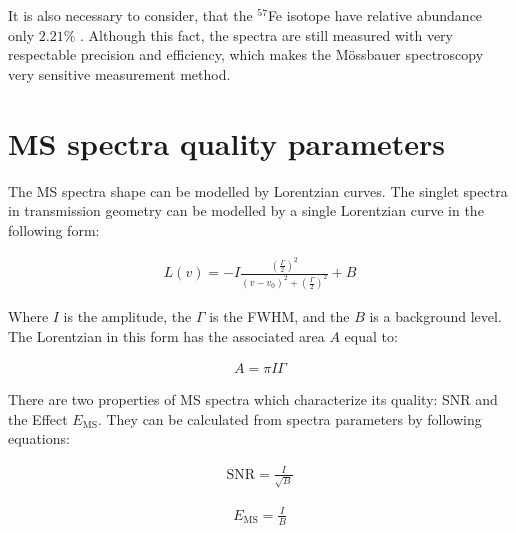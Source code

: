 \par
It is also necessary to consider, that the $^{57}$Fe isotope have relative abundance only $2.21 \%$ \cite{compounds}. Although this fact, the spectra are still measured with very respectable precision and efficiency, which makes the Mössbauer spectroscopy very sensitive measurement method.

\section{MS spectra quality parameters}
The MS spectra shape can be modelled by Lorentzian curves. The singlet spectra in transmission geometry can be modelled by a single Lorentzian curve in the following form:

\begin{equation}
\begin{aligned}
L(v) = -I\frac{(\frac{\Gamma}{2})^2}{(v - v_0)^2 + (\frac{\Gamma}{2})^2} + B
\end{aligned}
\label{lor}
\end{equation}

Where $I$ is the amplitude, the $\Gamma$ is the FWHM, and the $B$ is a background level. The Lorentzian in this form has the associated area $A$ equal to:

\begin{equation}
\begin{aligned}
A = \pi I \Gamma
\end{aligned}
\label{area}
\end{equation}

There are two properties of MS spectra which characterize its quality: SNR and the Effect $E_{\textrm{MS}}$. They can be calculated from spectra parameters by following equations:

\begin{equation}
\begin{aligned}
\textrm{SNR} = \frac{I}{\sqrt{B}}
\end{aligned}
\label{SNR}
\end{equation}

\begin{equation}
\begin{aligned}
E_{\textrm{MS}} = \frac{I}{B}
\end{aligned}
\label{effect}
\end{equation}



